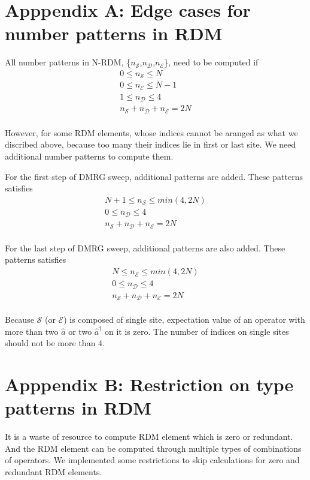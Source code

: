 \section*{Apppendix A: Edge cases for number patterns in RDM}
All number patterns in N-RDM, \{$n_\mathcal{S}$,$n_\mathcal{D}$,$n_\mathcal{E}$\}, need to be computed if 
\begin{align}
0\le n_\mathcal{S} \le N \\
0\le n_\mathcal{E} \le N-1 \\
1\le n_\mathcal{D} \le 4 \\
n_\mathcal{S} +n_\mathcal{D} +n_\mathcal{E} =2N \\
\end{align}

However, for some RDM elements, whose indices cannot be aranged as what we discribed above, because too many their indices lie in first or last site. We need additional number patterns to compute them.

For the first step of DMRG sweep, additional patterns are added. These patterns satisfies
\begin{align}
N+1\le n_\mathcal{S} \le min(4,2N) \\
0\le n_\mathcal{D} \le 4 \\
n_\mathcal{S} +n_\mathcal{D} +n_\mathcal{E} =2N \\
\end{align}

For the last step of DMRG sweep, additional patterns are also added. These patterns satisfies
\begin{align}
N\le n_\mathcal{E} \le min(4,2N) \\
0\le n_\mathcal{D} \le 4 \\
n_\mathcal{S} +n_\mathcal{D} +n_\mathcal{E} =2N \\
\end{align}

Because $\mathcal{S}$ (or $\mathcal{E}$) is composed of single site, expectation value of an operator with more than two $\hat{a}$ or two $\hat{a}^\dagger$ on it is zero. The number of indices on single sites should not be more than 4.

\section*{Apppendix B: Restriction on type patterns in RDM}
It is a waste of resource to compute RDM element which is zero or redundant. And the RDM element can be computed through multiple types of combinations of operators. We implemented some restrictions to skip calculations for zero and redundant RDM elements.


